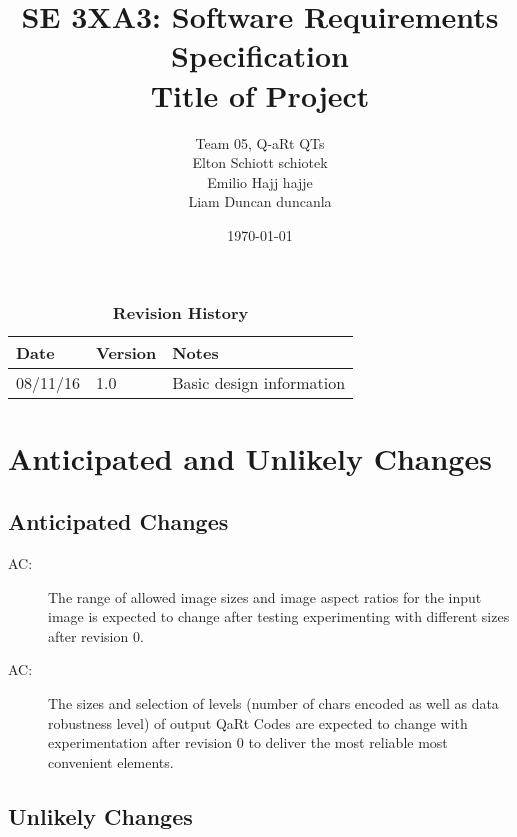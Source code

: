 \documentclass[12pt, titlepage]{article}
\title{SE 3XA3: Software Requirements Specification\\Title of Project}
\author{Team 05, Q-aRt QTs 
\\Elton Schiott schiotek 
\\Emilio Hajj hajje 
\\Liam Duncan duncanla
}
\date{\today}
\newcounter{acnum}
\newcommand{\actheacnum}{AC\theacnum}
\begin{document}
\maketitle

\tableofcontents
\listoftables
\listoffigures

\begin{table}[bp]
\caption{\bf Revision History}
\begin{tabularx}{\textwidth}{p{3cm}p{2cm}X}
\toprule {\bf Date} & {\bf Version} & {\bf Notes}\\
\midrule
08/11/16 & 1.0 & Basic design information\\
\bottomrule
\end{tabularx}
\end{table}

\newpage


\section{Anticipated and Unlikely Changes} \label{SecChange}


\subsection{Anticipated Changes} \label{SecAchange}


\begin{description}
\item[ \actheacnum \label{acInputImage}:] 
The range of allowed image sizes and image aspect ratios for the input image is expected to change after testing experimenting with different sizes after revision 0.

\item[ \actheacnum \label{QRCodeSizes}:] 
The sizes and selection of levels (number of chars encoded as well as data robustness level) of output QaRt Codes are expected to change with experimentation after revision 0 to deliver the most reliable most convenient elements.

\end{description}

\subsection{Unlikely Changes} \label{SecUchange}
\end{document}
